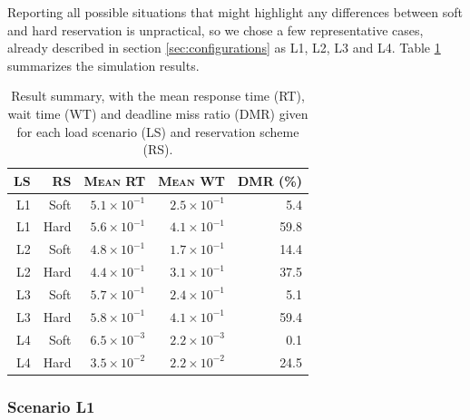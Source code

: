 \documentclass[times, 10pt,twocolumn]{article}
\begin{document}
\label{sec:indiv-simul-results}

Reporting all possible situations that might highlight any differences
between soft and hard reservation is unpractical, so we chose a few
representative cases, already described in section
\ref{sec:configurations} as L1, L2, L3 and L4. Table \ref{tab:summary}
summarizes the simulation results.

\begin{table}[ht]
  \centering
  \begin{tabular}[t]{rrrrr} \hline
    \textsc{LS} & \textsc{RS} & \textsc{Mean RT} & \textsc{Mean WT} & \textsc{DMR (\%)} \\ \hline
    L1 & Soft & $5.1\times 10^{-1}$   & $2.5\times 10^{-1}$   & 5.4  \\
    L1 & Hard & $5.6\times 10^{-1}$   & $4.1\times 10^{-1}$   & 59.8 \\
    L2 & Soft & $4.8\times 10^{-1}$   & $1.7\times 10^{-1}$   & 14.4 \\
    L2 & Hard & $4.4\times 10^{-1}$   & $3.1\times 10^{-1}$   & 37.5 \\
    L3 & Soft & $5.7\times 10^{-1}$   & $2.4\times 10^{-1}$   & 5.1  \\
    L3 & Hard & $5.8\times 10^{-1}$   & $4.1\times 10^{-1}$   & 59.4 \\
    L4 & Soft & $6.5\times 10^{-3}$   & $2.2\times 10^{-3}$   & 0.1  \\
    L4 & Hard & $3.5\times 10^{-2}$   & $2.2\times 10^{-2}$   & 24.5 \\ \hline    
  \end{tabular}
  \caption{Result summary, with the mean response time (RT), wait time
  (WT) and deadline miss ratio (DMR) given for each load scenario (LS)
  and reservation scheme (RS).}
  \label{tab:summary}
\end{table}

\subsubsection{Scenario L1}
\label{sec:scenario-l1}
\end{document}
